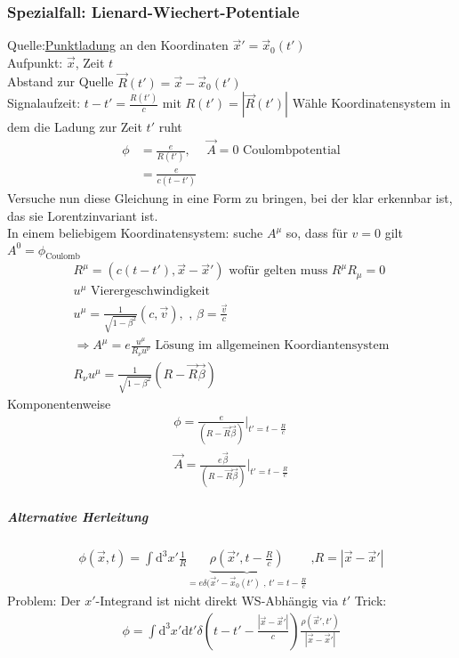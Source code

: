 \documentclass[a4paper]{article}
\begin{document}
\subsubsection{Spezialfall: Lienard-Wiechert-Potentiale}
Quelle:\underline{Punktladung} an den Koordinaten $\vec{x}'=\vec{x}_0(t')$ \\
Aufpunkt: $\vec{x}$, Zeit $t$\\
Abstand zur Quelle $\vec{R}(t')=\vec{x}-\vec{x}_0(t')$\\
Signalaufzeit: $t-t'=\frac{R(t')}{c}$ mit $R(t')=|\vec{R}(t')|$
Wähle Koordinatensystem in dem die Ladung zur Zeit $t'$ ruht
\begin{align}
\phi&=\frac{e}{R(t')}, & \vec{A}=0 \text{ Coulombpotential}\\
&=\frac{e}{c(t-t')}
\end{align}
Versuche nun diese Gleichung in eine Form zu bringen, bei der klar erkennbar
ist, das sie Lorentzinvariant ist.\\
In einem beliebigem Koordinatensystem: suche $A^\mu$ so, dass für $v=0$ gilt
$A^0=\phi_{\text{Coulomb}}$\\
\begin{align}
R^\mu=(c(t-t'),\vec{x}-\vec{x}') \text{ wofür gelten muss }R^\mu R_\mu=0\\
u^\mu \text{ Vierergeschwindigkeit}\\
u^\mu=\frac{1}{\sqrt{1-\beta^2}}(c,\vec{v}), \text{ , }
\beta=\frac{\vec{v}}{c}\\
\Rightarrow A^\mu=e\frac{u^\mu}{R_\nu u^\nu} \text{ Lösung im allgemeinen
Koordiantensystem}\\
R_\nu u^\mu=\frac{1}{\sqrt{1-\beta^2}}(R-\vec{R}\vec{\beta})
\end{align}
Komponentenweise
\begin{align}
\phi=\frac{e}{(R-\vec{R}\vec{\beta})}|_{t'=t-\frac{R}{c}}\\
\vec{A}=\frac{e\vec{\beta}}{(R-\vec{R}\vec{\beta})}|_{t'=t-\frac{R}{c}}
\end{align}
\subparagraph{Alternative Herleitung}
\begin{align}
\phi(\vec{x},t)=\int \mathrm{d}^3x' \frac{1}{R}
\underbrace{\rho(\vec{x}',t-\frac{R}{c})}_{=e
\delta(\vec{x}'-\vec{x}_0(t')\text{ , }t'=t-\frac{R}{c}} \text{ ,
}R=|\vec{x}-\vec{x}'|
\end{align}
Problem: Der $x'$-Integrand ist nicht direkt WS-Abhängig via $t'$
Trick: 
\begin{align}
\phi=\int \mathrm{d}^3x' \mathrm{d}t' \delta\left(t-t'-\frac{|\vec{x}-\vec{x}'|}{c}\right)
\frac{\rho(\vec{x}',t')}{|\vec{x}-\vec{x}'|}\\
\end{align}
\end{document}
